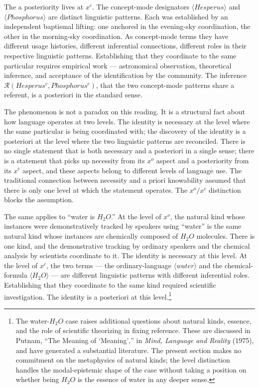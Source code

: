 \documentclass[10pt]{article}
\begin{document}
The a posteriority lives at \(x^c\). The concept-mode designators \(\langle Hesperus \rangle\) and \(\langle Phosphorus \rangle\) are distinct linguistic patterns. Each was established by an independent baptismal lifting: one anchored in the evening-sky coordination, the other in the morning-sky coordination. As concept-mode terms they have different usage histories, different inferential connections, different roles in their respective linguistic patterns. Establishing that they coordinate to the same particular requires empirical work --- astronomical observation, theoretical inference, and acceptance of the identification by the community. The inference \(\mathcal{R}(Hesperus^c, Phosphorus^c)\), that the two concept-mode patterns share a referent, is a posteriori in the standard sense.

The phenomenon is not a paradox on this reading. It is a structural fact about how language operates at two levels. The identity is necessary at the level where the same particular is being coordinated with; the discovery of the identity is a posteriori at the level where the two linguistic patterns are reconciled. There is no single statement that is both necessary and a posteriori in a single sense; there is a statement that picks up necessity from its \(x^o\) aspect and a posteriority from its \(x^c\) aspect, and these aspects belong to different levels of language use. The traditional connection between necessity and a priori knowability assumed that there is only one level at which the statement operates. The \(x^o/x^c\) distinction blocks the assumption.

The same applies to ``water is \(H_2O\).'' At the level of \(x^o\), the natural kind whose instances were demonstratively tracked by speakers using ``water'' is the same natural kind whose instances are chemically composed of \(H_2O\) molecules. There is one kind, and the demonstrative tracking by ordinary speakers and the chemical analysis by scientists coordinate to it. The identity is necessary at this level. At the level of \(x^c\), the two terms --- the ordinary-language \(\langle water \rangle\) and the chemical-formula \(\langle H_2O \rangle\) --- are different linguistic patterns with different inferential roles. Establishing that they coordinate to the same kind required scientific investigation. The identity is a posteriori at this level.\footnote{The water-\(H_2O\) case raises additional questions about natural kinds, essence, and the role of scientific theorizing in fixing reference. These are discussed in Putnam, ``The Meaning of `Meaning','' in \emph{Mind, Language and Reality} (1975), and have generated a substantial literature. The present section makes no commitment on the metaphysics of natural kinds; the level distinction handles the modal-epistemic shape of the case without taking a position on whether being \(H_2O\) is the essence of water in any deeper sense.}
\end{document}
